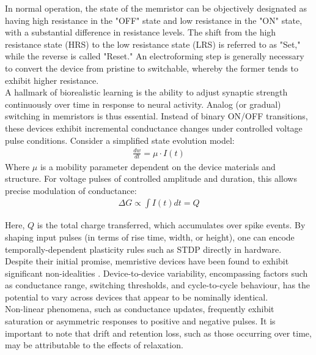 
\noindent In normal operation, the state of the memristor can be objectively designated as having high resistance in the "OFF" state and low resistance in the "ON" state, with a substantial difference in resistance levels. The shift from the high resistance state (HRS) to the low resistance state (LRS) is referred to as "Set," while the reverse is called "Reset." An electroforming step is generally necessary to convert the device from pristine to switchable, whereby the former tends to exhibit higher resistance. \\

\noindent A hallmark of biorealistic learning is the ability to adjust synaptic strength continuously over time in response to neural activity. Analog (or gradual) switching in memristors is thus essential. Instead of binary ON/OFF transitions, these devices exhibit incremental conductance changes under controlled voltage pulse conditions. Consider a simplified state evolution model:
\begin{align}
    \frac{dw}{dt} = \mu \cdot I(t) \label{eq:1.25}
\end{align}
Where $\mu$ is a mobility parameter dependent on the device materials and structure. For voltage pulses of controlled amplitude and duration, this allows precise modulation of conductance:
\begin{align}
    \Delta G \varpropto \int I(t) dt = Q \label{eq:1.26}
\end{align}

\noindent Here, $Q$ is the total charge transferred, which accumulates over spike events. By shaping input pulses (in terms of rise time, width, or height), one can encode temporally-dependent plasticity rules such as STDP directly in hardware.\\

\noindent Despite their initial promise, memristive devices have been found to exhibit significant non-idealities \cite{govoreanu2013vacancy}. Device-to-device variability, encompassing factors such as conductance range, switching thresholds, and cycle-to-cycle behaviour, has the potential to vary across devices that appear to be nominally identical.\\

\noindent Non-linear phenomena, such as conductance updates, frequently exhibit saturation or asymmetric responses to positive and negative pulses. It is important to note that drift and retention loss, such as those occurring over time, may be attributable to the effects of relaxation. \\


